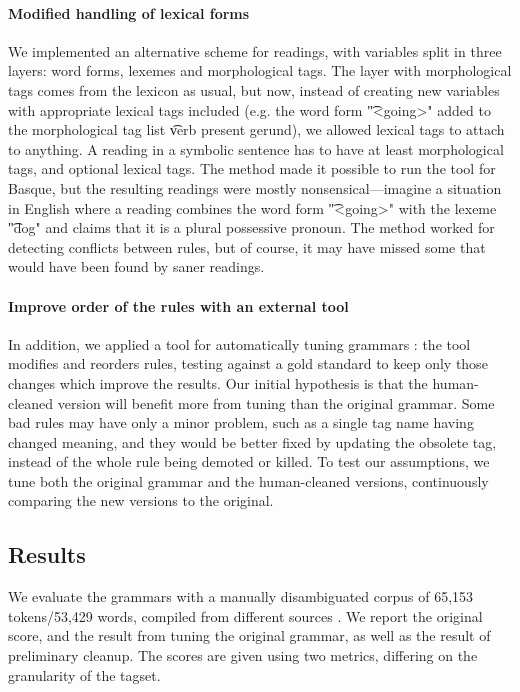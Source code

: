 {{\paragraph{Modified handling of lexical forms}

We implemented an alternative scheme for readings, with variables
split in three layers: word forms, lexemes and morphological tags. The
layer with morphological tags comes from the lexicon as usual, but
now, instead of creating new variables with appropriate lexical tags
included (e.g. the word form \t{"<going>"} added to the morphological
tag list \t{verb present gerund}), we allowed lexical tags to attach
to anything. A reading in a symbolic sentence has to have at least
morphological tags, and optional lexical tags. The method made it
possible to run the tool for Basque, but the resulting readings were
mostly nonsensical---imagine a situation in English where a reading
combines the word form \t{"<going>"} with the lexeme \t{"dog"} and
claims that it is a plural possessive pronoun. The method worked for
detecting conflicts between rules, but of course, it may have missed
some that would have been found by saner readings.

\paragraph{Improve order of the rules with an external tool}

In addition, we applied a tool for automatically tuning grammars
\cite{bick2013tuning}: the tool modifies and reorders rules, testing
against a gold standard to keep only those changes which improve the results.
Our initial hypothesis is that the human-cleaned version will benefit more
from tuning than the original grammar. Some bad rules may have only a minor
problem, such as a single tag name having changed meaning, and they would be
better fixed by updating the obsolete tag, instead of the whole rule being
demoted or killed. To test our assumptions, we tune both the original
grammar and the human-cleaned versions, continuously comparing the new
versions to the original.


\subsection{Results}

We evaluate the grammars with a manually disambiguated corpus of
65,153 tokens/53,429 words, compiled from different sources
\cite{aduriz2006epec}.  We report the original score, and the result
from tuning the original grammar, as well as the result of
preliminary cleanup.  The scores are given using two metrics,
differing on the granularity of the tagset.

}}
